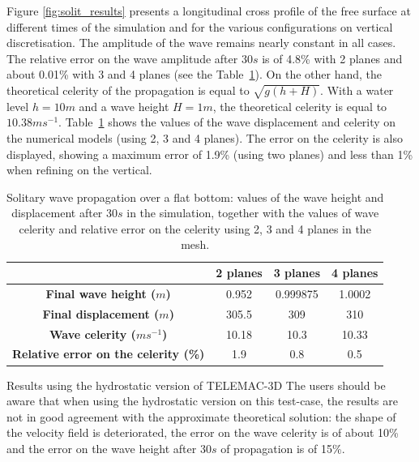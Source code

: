 %
Figure \ref{fig:solit_results} presents a longitudinal cross profile of the free surface
at different times of the simulation and for the various configurations
on vertical discretisation.
The amplitude of the wave remains nearly constant in all cases.
The relative error on the wave amplitude after $30s$ is of 4.8\% with 2 planes and about 0.01\%
with 3 and 4 planes (see the Table~\ref{tab:solit_celerity}).
On the other hand, the theoretical celerity of the propagation is equal to $\sqrt{g(h+H)}$.
With a water level $h = 10m$ and a wave height $H=1m$,
the theoretical celerity is equal to $10.38ms^{-1}$.
Table~\ref{tab:solit_celerity} shows the values of the wave displacement and celerity
on the numerical models (using 2, 3 and 4 planes). The error on the celerity is also
displayed, showing a maximum error of 1.9\% (using two planes) and less than 1\% when refining on the vertical.
\begin{table}[H]
\caption{Solitary wave propagation over a flat bottom:
values of the wave height and displacement after $30s$ in the simulation,
together with the values of wave celerity and relative error on the celerity
using 2, 3 and 4 planes in the mesh.}
\label{tab:solit_celerity}
\begin{center}\begin{tabular}{|c|c|c|c|}
\hline
~ & \textbf{2 planes} & \textbf{3 planes} & \textbf{4 planes}\\
\hline
\textbf{Final wave height ($m$)} & 0.952 & 0.999875 & 1.0002 \\
\hline
\textbf{Final displacement ($m$)} & 305.5 & 309 & 310 \\
\hline
\textbf{Wave celerity ($ms^{-1}$)} & 10.18 & 10.3 & 10.33 \\
\hline
\textbf{Relative error on the celerity (\%)} & 1.9 & 0.8 & 0.5 \\
\hline
\end{tabular}\end{center}
\end{table}
\begin{WarningBlock}{Results using the hydrostatic version of TELEMAC-3D}
The users should be aware that when using the hydrostatic version on this test-case, the
results are not in good agreement with the approximate theoretical solution: the shape of the velocity field
is deteriorated, the error on the wave celerity is of about 10\% and the error on the wave height after $30s$
of propagation is of 15\%.
\end{WarningBlock}
